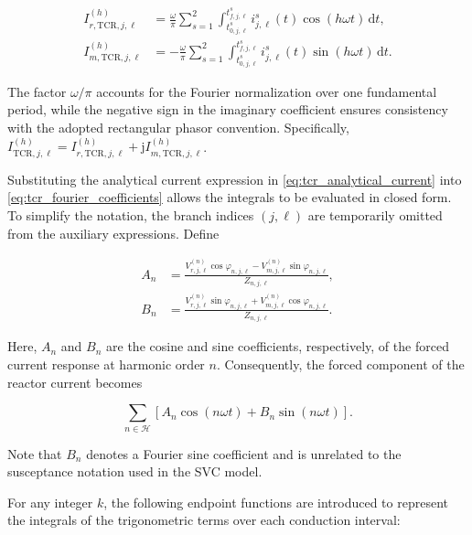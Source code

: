 \documentclass[journal]{IEEEtran}
\begin{document}
\begin{subequations}
\label{eq:tcr_fourier_coefficients}
\begin{align}
    I_{r,\mathrm{TCR},j,\ell}^{(h)}
    &=\frac{\omega}{\pi}\sum_{s=1}^{2}
    \int_{t_{0,j,\ell}^{s}}^{t_{f,j,\ell}^{s}}
    i_{j,\ell}^{s}(t)\cos(h\omega t)\,\mathrm{d}t,\\
    I_{m,\mathrm{TCR},j,\ell}^{(h)}
    &=-\frac{\omega}{\pi}\sum_{s=1}^{2}
    \int_{t_{0,j,\ell}^{s}}^{t_{f,j,\ell}^{s}}
    i_{j,\ell}^{s}(t)\sin(h\omega t)\,\mathrm{d}t.
\end{align}
\end{subequations}

The factor $\omega/\pi$ accounts for the Fourier normalization over
one fundamental period, while the negative sign in the imaginary
coefficient ensures consistency with the adopted rectangular phasor
convention. Specifically,
$I_{\mathrm{TCR},j,\ell}^{(h)}
=I_{r,\mathrm{TCR},j,\ell}^{(h)}
+\mathrm{j}I_{m,\mathrm{TCR},j,\ell}^{(h)}$.

Substituting the analytical current expression in
\eqref{eq:tcr_analytical_current} into
\eqref{eq:tcr_fourier_coefficients} allows the integrals to be
evaluated in closed form. To simplify the notation, the branch indices
$(j,\ell)$ are temporarily omitted from the auxiliary expressions.
Define

\begin{subequations}
\label{eq:tcr_forced_coefficients}
\begin{align}
    A_n&=\frac{V_{r,j,\ell}^{(n)}\cos\varphi_{n,j,\ell}
    -V_{m,j,\ell}^{(n)}\sin\varphi_{n,j,\ell}}{Z_{n,j,\ell}},\\
    B_n&=\frac{V_{r,j,\ell}^{(n)}\sin\varphi_{n,j,\ell}
    +V_{m,j,\ell}^{(n)}\cos\varphi_{n,j,\ell}}{Z_{n,j,\ell}}.
\end{align}
\end{subequations}

Here, $A_n$ and $B_n$ are the cosine and sine coefficients,
respectively, of the forced current response at harmonic order $n$.
Consequently, the forced component of the reactor current becomes

\[
    \sum_{n\in\mathcal H}
    \left[A_n\cos(n\omega t)+B_n\sin(n\omega t)\right].
\]

Note that $B_n$ denotes a Fourier sine coefficient and is unrelated
to the susceptance notation used in the SVC model.

For any integer $k$, the following endpoint functions are introduced
to represent the integrals of the trigonometric terms over each
conduction interval:
\end{document}
